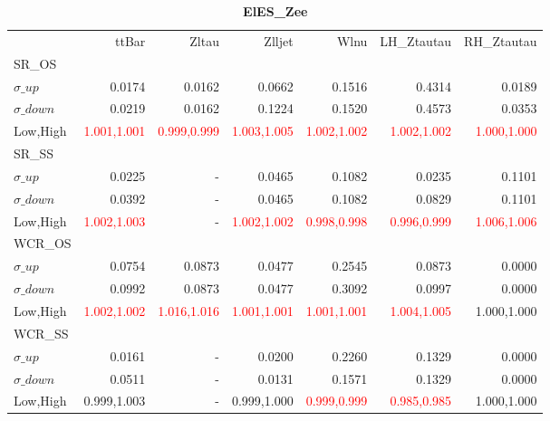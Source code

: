 \documentclass[11pt,oneside,a4paper]{article}
\begin{document}
\begin{table}
\caption{\bf{ElES\_Zee}}
\centering
\begin{tabular}{lrrrrrr}
& ttBar & Zltau & Zlljet & Wlnu & LH\_Ztautau & RH\_Ztautau \\

SR\_OS &  &  &  &  &  &  \\
$\sigma\_up$ & 0.0174 & 0.0162 & 0.0662 & 0.1516 & 0.4314 & 0.0189 \\
$\sigma\_down$ & 0.0219 & 0.0162 & 0.1224 & 0.1520 & 0.4573 & 0.0353 \\
Low,High & \textcolor{red}{1.001,1.001} & \textcolor{red}{0.999,0.999} & \textcolor{red}{1.003,1.005} & \textcolor{red}{1.002,1.002} & \textcolor{red}{1.002,1.002} & \textcolor{red}{1.000,1.000} \\

\hline
SR\_SS &  &  &  &  &  &  \\
$\sigma\_up$ & 0.0225 & - & 0.0465 & 0.1082 & 0.0235 & 0.1101 \\
$\sigma\_down$ & 0.0392 & - & 0.0465 & 0.1082 & 0.0829 & 0.1101 \\
Low,High & \textcolor{red}{1.002,1.003} & - & \textcolor{red}{1.002,1.002} & \textcolor{red}{0.998,0.998} & \textcolor{red}{0.996,0.999} & \textcolor{red}{1.006,1.006} \\

\hline
WCR\_OS &  &  &  &  &  &  \\
$\sigma\_up$ & 0.0754 & 0.0873 & 0.0477 & 0.2545 & 0.0873 & 0.0000 \\
$\sigma\_down$ & 0.0992 & 0.0873 & 0.0477 & 0.3092 & 0.0997 & 0.0000 \\
Low,High & \textcolor{red}{1.002,1.002} & \textcolor{red}{1.016,1.016} & \textcolor{red}{1.001,1.001} & \textcolor{red}{1.001,1.001} & \textcolor{red}{1.004,1.005} & 1.000,1.000 \\

\hline
WCR\_SS &  &  &  &  &  &  \\
$\sigma\_up$ & 0.0161 & - & 0.0200 & 0.2260 & 0.1329 & 0.0000 \\
$\sigma\_down$ & 0.0511 & - & 0.0131 & 0.1571 & 0.1329 & 0.0000 \\
Low,High & 0.999,1.003 & - & 0.999,1.000 & \textcolor{red}{0.999,0.999} & \textcolor{red}{0.985,0.985} & 1.000,1.000 \\

\end{tabular}
\end{table}
\end{document}
